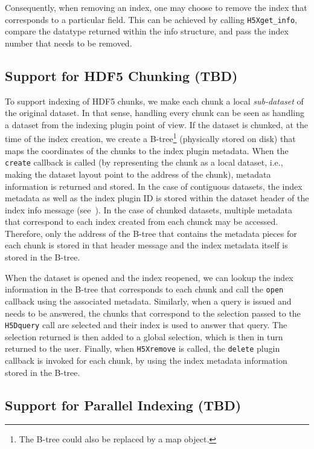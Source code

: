 Consequently, when removing an index, one may choose to remove the index that
corresponds to a particular field. This can be achieved by calling \texttt{H5Xget\_info},
compare the datatype returned within the info structure, and pass the index number
that needs to be removed.

\subsection{Support for HDF5 Chunking (TBD)}

To support indexing of HDF5 chunks, we make each chunk a local \textit{sub-dataset}
of the original dataset. In that sense, handling every chunk can be seen as handling
a dataset from the indexing plugin point of view. If the dataset is chunked,
at the time of the index creation, we create a B-tree\footnote{The B-tree could also
be replaced by a map object.} (physically
stored on disk) that maps the coordinates of the chunks to the index plugin metadata.
When the \texttt{create} callback is called (by representing the chunk as
a local dataset, i.e., making the dataset layout point to the address of the chunk),
metadata information is returned and stored.
In the case of contiguous datasets, the index metadata as well as the index plugin ID is
stored within the dataset header of the index info message (see~).
In the case of chunked datasets, multiple metadata that correspond to each index created
from each chunck may be accessed. Therefore, only the address of the B-tree that contains the 
metadata pieces for each chunk is stored in that header message and the index
metadata itself is stored in the B-tree.

When the dataset is opened and the index reopened, we can lookup the index
information in the B-tree that corresponds to each chunk and call the \texttt{open}
callback using the associated metadata.
Similarly, when a query is issued and needs to be answered, the chunks that
correspond to the selection passed to the \texttt{H5Dquery} call are selected
and their index is used to answer that query. The selection returned is then
added to a global selection, which is then in turn returned to the user.
Finally, when \texttt{H5Xremove} is called, the \texttt{delete} plugin callback is
invoked for each chunk, by using the index metadata information stored in the B-tree.

\subsection{Support for Parallel Indexing (TBD)}

